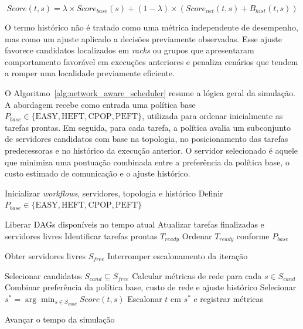\documentclass[12pt]{article}
\begin{document}
\begin{equation}
Score(t,s) = \lambda \times Score_{base}(s) + (1 - \lambda) \times \left(Score_{net}(t,s) + B_{hist}(t,s)\right)
\label{eq:network_score}
\end{equation}

O termo histórico não é tratado como uma métrica independente de desempenho, mas como um ajuste aplicado a decisões previamente observadas. 
%
Esse ajuste favorece candidatos localizados em \textit{racks} ou grupos que apresentaram comportamento favorável em execuções anteriores e penaliza cenários que tendem a romper uma localidade previamente eficiente.

O Algoritmo~\ref{alg:network_aware_scheduler} resume a lógica geral da simulação.
%
A abordagem recebe como entrada uma política base $P_{base} \in \{\text{EASY}, \text{HEFT}, \text{CPOP}, \text{PEFT}\}$, utilizada para ordenar inicialmente as tarefas prontas.
%
Em seguida, para cada tarefa, a política avalia um subconjunto de servidores candidatos com base na topologia, no posicionamento das tarefas predecessoras e no histórico da execução anterior. 
%
O servidor selecionado é aquele que minimiza uma pontuação combinada entre a preferência da política base, o custo estimado de comunicação e o ajuste histórico.

\begin{algorithm}[htbp]
\caption{Simulação do escalonamento de DAGs com consciência da rede, combinado com uma política base}
\label{alg:network_aware_scheduler}
\begin{algorithmic}[1]

\STATE Inicializar \textit{workflows}, servidores, topologia e histórico
\STATE Definir $P_{base} \in \{\text{EASY}, \text{HEFT}, \text{CPOP}, \text{PEFT}\}$

    \STATE Liberar DAGs disponíveis no tempo atual
    \STATE Atualizar tarefas finalizadas e servidores livres
    \STATE Identificar tarefas prontas $T_{ready}$
    \STATE Ordenar $T_{ready}$ conforme $P_{base}$


        \STATE Obter servidores livres $S_{free}$
            \STATE Interromper escalonamento da iteração
        \ENDIF

        \STATE Selecionar candidatos $S_{cand} \subseteq S_{free}$
        \STATE Calcular métricas de rede para cada $s \in S_{cand}$
        \STATE Combinar preferência da política base, custo de rede e ajuste histórico
        \STATE Selecionar $s^* = \arg\min_{s \in S_{cand}} Score(t,s)$
        \STATE Escalonar $t$ em $s^*$ e registrar métricas

    \ENDFOR

    \STATE Avançar o tempo da simulação

\ENDWHILE

\end{algorithmic}
\end{algorithm}
\end{document}
